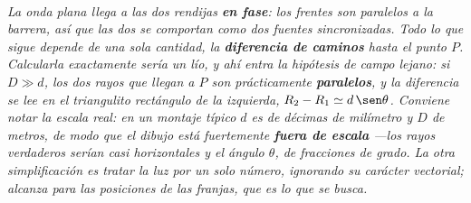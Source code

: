 \begin{center}
\begin{tikzpicture}[scale=1]
\end{tikzpicture}\\[0.5em]
{\small\itshape La onda plana llega a las dos rendijas \textbf{en fase}: los
frentes son paralelos a la barrera, así que las dos se comportan como dos
fuentes sincronizadas. Todo lo que sigue depende de una sola cantidad, la
\textbf{diferencia de caminos} hasta el punto $P$. Calcularla exactamente sería
un lío, y ahí entra la hipótesis de campo lejano: si $D \gg d$, los dos rayos
que llegan a $P$ son prácticamente \textbf{paralelos}, y la diferencia se lee en
el triangulito rectángulo de la izquierda, $R_2 - R_1 \simeq d\,\sen\theta$.
Conviene notar la escala real: en un montaje típico $d$ es de décimas de
milímetro y $D$ de metros, de modo que el dibujo está fuertemente
\textbf{fuera de escala} ---los rayos verdaderos serían casi horizontales y el
ángulo $\theta$, de fracciones de grado. La otra simplificación es tratar la luz
por un solo número, ignorando su carácter vectorial; alcanza para las posiciones
de las franjas, que es lo que se busca.}
\end{center}
